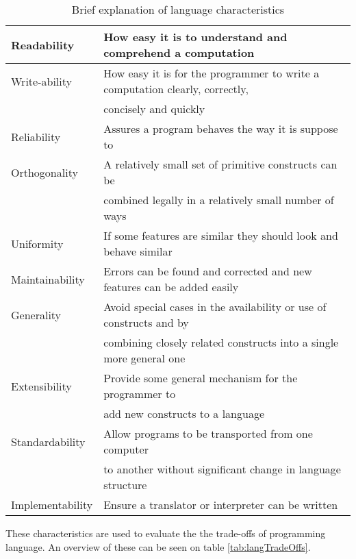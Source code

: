 \begin{table}[H]
	\begin{tabular}{|l|l|}
		\hline
		Readability & How easy it is to understand and comprehend a computation \\ \hline
		Write-ability & How easy it is for the programmer to write a computation clearly, correctly, \\
		~ & concisely and quickly \\ \hline
		Reliability & Assures a program behaves the way it is suppose to \\ \hline
		Orthogonality & A relatively small set of primitive constructs can be \\
		~ & combined legally in a relatively small number of ways \\ \hline		
		Uniformity & If some features are similar they should look and behave similar \\ \hline
		Maintainability & Errors can be found and corrected and new features can be added easily \\ \hline
		Generality & Avoid special cases in the availability or use of constructs and by \\ 
		~ & combining closely related constructs into a single more general one \\ \hline
		Extensibility & Provide some general mechanism for the programmer to \\
		~ & add new constructs to a language \\ \hline
		Standardability & Allow programs to be transported from one computer \\
		~ & to another without significant change in language structure \\ \hline
		Implementability & Ensure a translator or interpreter can be written \\
		\hline
	\end{tabular}
	\caption{Brief explanation of language characteristics \citep{sebesta}}
	\label{tab:langCharacteristics}
\end{table}

These characteristics are used to evaluate the the trade-offs of programming language. An overview of these can be seen on table \ref{tab:langTradeOffs}.

